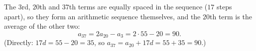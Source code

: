 The $3$rd, $20$th and $37$th terms are equally spaced in the sequence ($17$ steps apart), so they form an arithmetic sequence themselves, and the $20$th term is the average of the other two:
\[
a_{37}=2a_{20}-a_3=2\cdot55-20=\boxed{90}.
\]
(Directly: $17d=55-20=35$, so $a_{37}=a_{20}+17d=55+35=90$.)
